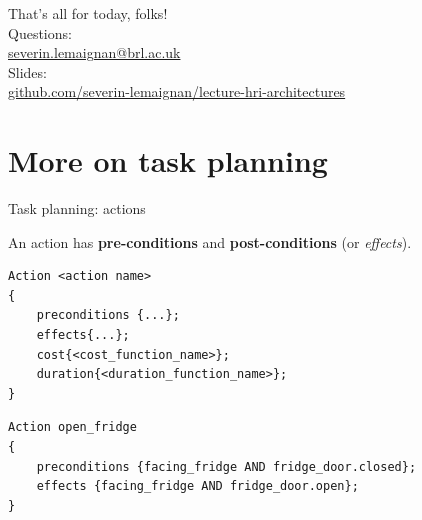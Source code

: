 \documentclass[compress]{beamer}
\begin{document}
\begin{frame}{}
    \begin{center}
        \Large
        That's all for today, folks!\\[2em]
        \normalsize
        Questions:\\
        \url{severin.lemaignan@brl.ac.uk} \\[1em]

        Slides:\\
        \href{https://github.com/severin-lemaignan/lecture-hri-architectures}{\small
        github.com/severin-lemaignan/lecture-hri-architectures}

    \end{center}
\end{frame}


\section[]{More on task planning}
\begin{frame}[fragile]{Task planning: actions}

    An action has \textbf{pre-conditions} and \textbf{post-conditions} (or \emph{effects}).

\begin{verbatim}
Action <action name>
{
    preconditions {...};
    effects{...};
    cost{<cost_function_name>};
    duration{<duration_function_name>};
}
\end{verbatim}

\pause

\begin{verbatim}
Action open_fridge
{
    preconditions {facing_fridge AND fridge_door.closed};
    effects {facing_fridge AND fridge_door.open};
}
\end{verbatim}

\end{frame}
\end{document}
